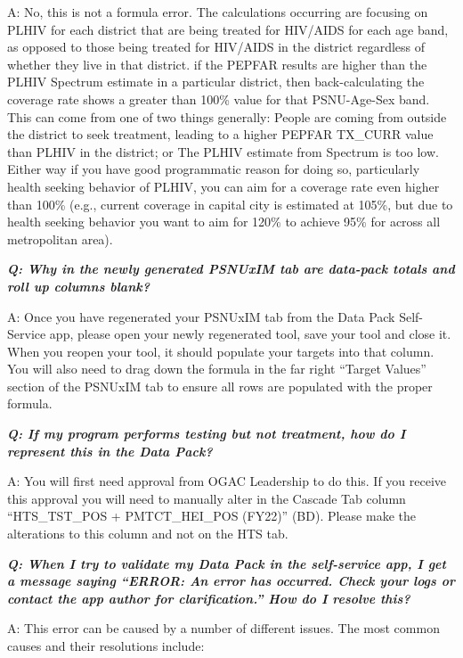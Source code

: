 \documentclass[
  openany]{book}
\begin{document}
A: No, this is not a formula error. The calculations occurring are focusing on PLHIV for each district that are being treated for HIV/AIDS for each age band, as opposed to those being treated for HIV/AIDS in the district regardless of whether they live in that district. if the PEPFAR results are higher than the PLHIV Spectrum estimate in a particular district, then back-calculating the coverage rate shows a greater than 100\% value for that PSNU-Age-Sex band. This can come from one of two things generally: People are coming from outside the district to seek treatment, leading to a higher PEPFAR TX\_CURR value than PLHIV in the district; or The PLHIV estimate from Spectrum is too low. Either way if you have good programmatic reason for doing so, particularly health seeking behavior of PLHIV, you can aim for a coverage rate even higher than 100\% (e.g., current coverage in capital city is estimated at 105\%, but due to health seeking behavior you want to aim for 120\% to achieve 95\% for across all metropolitan area).

\textbf{\emph{Q: Why in the newly generated PSNUxIM tab are data-pack totals and roll up columns blank?}}

A: Once you have regenerated your PSNUxIM tab from the Data Pack Self-Service app, please open your newly regenerated tool, save your tool and close it. When you reopen your tool, it should populate your targets into that column. You will also need to drag down the formula in the far right ``Target Values'' section of the PSNUxIM tab to ensure all rows are populated with the proper formula.

\textbf{\emph{Q: If my program performs testing but not treatment, how do I represent this in the Data Pack?}}

A: You will first need approval from OGAC Leadership to do this. If you receive this approval you will need to manually alter in the Cascade Tab column ``HTS\_TST\_POS + PMTCT\_HEI\_POS (FY22)'' (BD). Please make the alterations to this column and not on the HTS tab.

\textbf{\emph{Q: When I try to validate my Data Pack in the self-service app, I get a message saying ``ERROR: An error has occurred. Check your logs or contact the app author for clarification.'' How do I resolve this?}}

A: This error can be caused by a number of different issues. The most common causes and their resolutions include:
\end{document}
